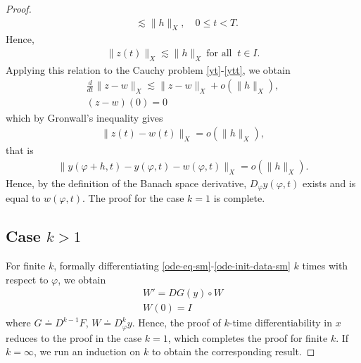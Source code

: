 \documentclass[12pt,reqno]{amsart}
\numberwithin{equation}{section}  %
\newcommand{\vp}{\varphi}
\begin{document}
\begin{proof}
\begin{equation*}
\begin{split}
  & \lesssim \| h \|_{X}, \quad 0 \le t < T.
\end{split}
\end{equation*}
%
%
Hence,
%
%
\begin{equation*}
\begin{split}
  \| z(t) \|_{X}  \lesssim  \| h \|_{X}  \ \text{for all } \ t \in I.
\end{split}
\end{equation*}
Applying this relation to the Cauchy problem \eqref{yt}-\eqref{ytt}, we obtain
%
\begin{gather*}
    \frac{d}{dt} \| z - w \|_{X} \lesssim  \| z - w \|_{X}  + o(\| h \|_{X}),
    \\
    (z-w)(0) = 0
\end{gather*}
which by Gronwall's inequality gives
%
%
%
%
%
%
%
\begin{equation*}
\begin{split}
  \| z(t) - w(t) \|_{X} 
  = o(\| h \|_{X}),
\end{split}
\end{equation*}
%
%
that is
%
%
\begin{equation*}
\begin{split}
  \| y(\vp + h, t) - y(\vp,t) - w(\vp,t) \|_{X} = o(\| h \|_{X}).
\end{split}
\end{equation*}
%
%
Hence, by the definition of the Banach space derivative, $D_{\vp}y(\vp,t)$
exists and is equal to $w(\vp,t)$. The proof for the case $k=1$ is complete.
\subsection*{Case $k >1$} 
\label{ssec:case-kg1}
For finite $k$, formally differentiating
\eqref{ode-eq-sm}-\eqref{ode-init-data-sm}
$k$ times with respect to $\vp$, we obtain
\begin{gather*}
  W' = DG(y) \circ W
  \\
  W(0) = I
\end{gather*}
where $G \doteq D^{k-1}F$, $W \doteq D_{\vp}^{k} y$. Hence, the proof of
$k$-time differentiability in $x$ reduces to the proof in the case $k=1$, which
completes the proof for finite $k$. If $k = \infty$, we run an induction on $k$ to
obtain the corresponding result.
\end{proof}
%
%
%
%
%
%
%
\end{document}
